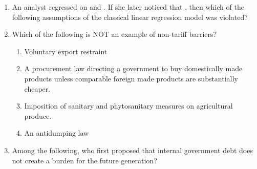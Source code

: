 \documentclass[12pt]{article}
\theoremstyle{remark}
\begin{document}
\begin{enumerate}
\begin{enumerate}  \end{enumerate}
\hfill{}
\item  An analyst regressed  on  and . If she later noticed that , then which of the following assumptions of the classical linear regression model was violated? 
\begin{enumerate}  \end{enumerate}
\hfill{}
\item  Which of the following is NOT an example of non-tariff barriers? \begin{enumerate} 
\item  Voluntary export restraint 
\item  A procurement law directing a government to buy domestically made products unless comparable foreign made products are substantially cheaper. 
\item  Imposition of sanitary and phytosanitary measures on agricultural produce. 
\item  An antidumping law 
\end{enumerate}
\hfill{}
\item Among the following, who first proposed that internal government debt does not create a burden for the future generation? 
\begin{enumerate} 
\end{enumerate}
\end{enumerate}
\end{document}
